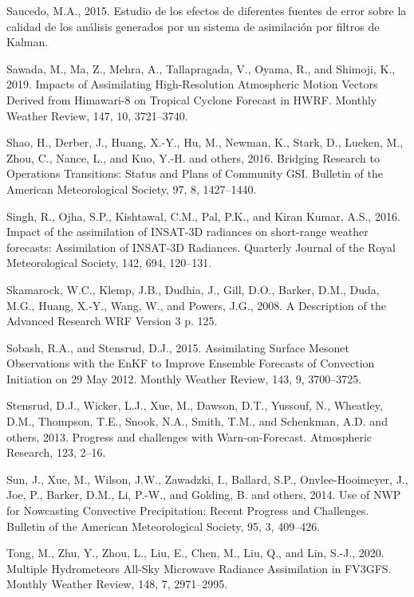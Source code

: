 \documentclass[12pt,oneside,a4paper]{reedthesis}
\begin{document}
\leavevmode\hypertarget{ref-saucedo2015}{}%
Saucedo, M.A., 2015. Estudio de los efectos de diferentes fuentes de error sobre la calidad de los análisis generados por un sistema de asimilación por filtros de Kalman.

\leavevmode\hypertarget{ref-sawada2019}{}%
Sawada, M., Ma, Z., Mehra, A., Tallapragada, V., Oyama, R., and Shimoji, K., 2019. Impacts of Assimilating High-Resolution Atmospheric Motion Vectors Derived from Himawari-8 on Tropical Cyclone Forecast in HWRF. Monthly Weather Review, 147, 10, 3721--3740.

\leavevmode\hypertarget{ref-shao2016}{}%
Shao, H., Derber, J., Huang, X.-Y., Hu, M., Newman, K., Stark, D., Lueken, M., Zhou, C., Nance, L., and Kuo, Y.-H. and others, 2016. Bridging Research to Operations Transitions: Status and Plans of Community GSI. Bulletin of the American Meteorological Society, 97, 8, 1427--1440.

\leavevmode\hypertarget{ref-singh2016}{}%
Singh, R., Ojha, S.P., Kishtawal, C.M., Pal, P.K., and Kiran Kumar, A.S., 2016. Impact of the assimilation of INSAT-3D radiances on short-range weather forecasts: Assimilation of INSAT-3D Radiances. Quarterly Journal of the Royal Meteorological Society, 142, 694, 120--131.

\leavevmode\hypertarget{ref-skamarock2008}{}%
Skamarock, W.C., Klemp, J.B., Dudhia, J., Gill, D.O., Barker, D.M., Duda, M.G., Huang, X.-Y., Wang, W., and Powers, J.G., 2008. A Description of the Advanced Research WRF Version 3 p. 125.

\leavevmode\hypertarget{ref-sobash2015}{}%
Sobash, R.A., and Stensrud, D.J., 2015. Assimilating Surface Mesonet Observations with the EnKF to Improve Ensemble Forecasts of Convection Initiation on 29 May 2012. Monthly Weather Review, 143, 9, 3700--3725.

\leavevmode\hypertarget{ref-stensrud2013}{}%
Stensrud, D.J., Wicker, L.J., Xue, M., Dawson, D.T., Yussouf, N., Wheatley, D.M., Thompson, T.E., Snook, N.A., Smith, T.M., and Schenkman, A.D. and others, 2013. Progress and challenges with Warn-on-Forecast. Atmospheric Research, 123, 2--16.

\leavevmode\hypertarget{ref-sun2014}{}%
Sun, J., Xue, M., Wilson, J.W., Zawadzki, I., Ballard, S.P., Onvlee-Hooimeyer, J., Joe, P., Barker, D.M., Li, P.-W., and Golding, B. and others, 2014. Use of NWP for Nowcasting Convective Precipitation: Recent Progress and Challenges. Bulletin of the American Meteorological Society, 95, 3, 409--426.

\leavevmode\hypertarget{ref-tong2020}{}%
Tong, M., Zhu, Y., Zhou, L., Liu, E., Chen, M., Liu, Q., and Lin, S.-J., 2020. Multiple Hydrometeors All-Sky Microwave Radiance Assimilation in FV3GFS. Monthly Weather Review, 148, 7, 2971--2995.
\end{document}
